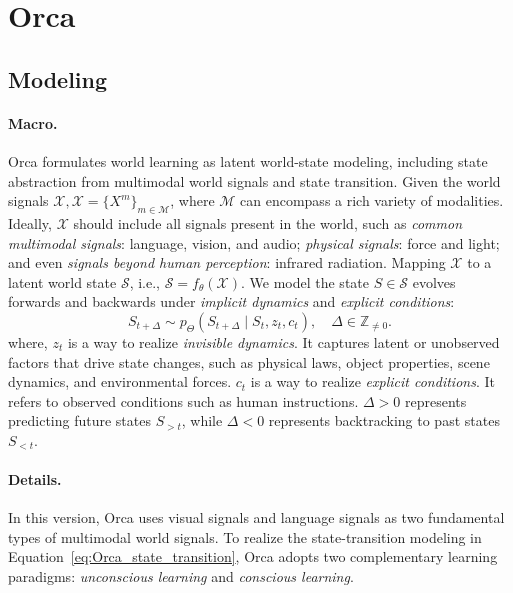 
\section{Orca}\label{sec:method}


\subsection{Modeling}
\label{sec:method_modeling}


\paragraph{Macro.} Orca formulates world learning as latent world-state modeling, including state abstraction from multimodal world signals and state transition.
Given the world signals $\mathcal{X}, \mathcal{X}=\{X^{m}\}_{m\in\mathcal{M}}$, where $\mathcal{M}$ can encompass a rich variety of modalities. Ideally, $\mathcal{X}$ should include all signals present in the world, such as \textit{common multimodal signals}: language, vision, and audio; \textit{physical signals}: force and light; and even \textit{signals beyond human perception}: infrared radiation. Mapping $\mathcal{X}$ to a latent world state $\mathcal{S}$, i.e., $\mathcal{S} = f_{\theta}(\mathcal{X}).$
We model the state $S\in \mathcal{S}$ evolves forwards and backwards under \textit{implicit dynamics} and \textit{explicit conditions}:
\begin{equation}
\label{eq:Orca_state_transition}
    S_{t+\Delta}\sim p_{\Theta}
    \left(S_{t+\Delta}\mid S_t,z_t,c_t\right),
    \quad \Delta\in\mathbb{Z}_{\ne 0}.
\end{equation}
where, $z_t$ is a way to realize \textit{invisible dynamics}. It captures latent or unobserved factors that drive state changes, such as physical laws, object properties, scene dynamics, and environmental forces. $c_t$ is a way to realize \textit{explicit conditions}. It refers to observed conditions such as human instructions. $\Delta>0$ represents predicting future states $S_{> t}$, while $\Delta<0$ represents backtracking to past states $S_{< t}$. 



\paragraph{Details.} 
In this version, Orca uses visual signals and language signals as two fundamental types of multimodal world signals.
To realize the state-transition modeling in Equation~\ref{eq:Orca_state_transition}, Orca adopts two complementary learning paradigms: \textit{unconscious learning} and \textit{conscious learning}.



